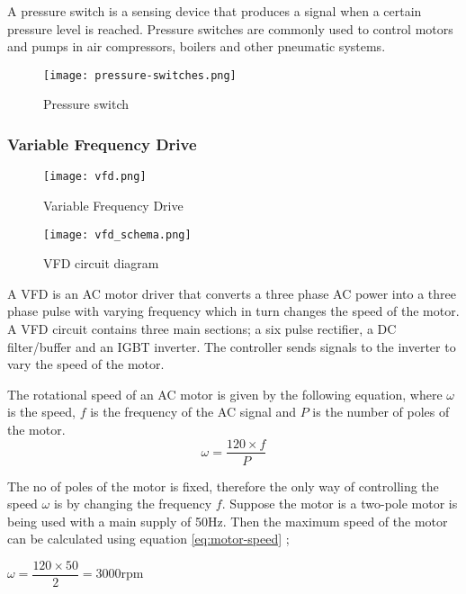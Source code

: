 \documentclass[a4paper,12pt]{article}
\begin{document}
				A pressure switch is a sensing device that produces a signal when a certain pressure level is reached.
				Pressure switches are commonly used to control motors and pumps in air compressors, boilers and other pneumatic systems. 
				
				
						\begin{figure}[H]
							\centering
							\texttt{[image: pressure-switches.png]}
							\caption{Pressure switch}
							\label{fig:pressure-switch}
						\end{figure}
						
				\subsubsection*{Variable Frequency Drive}
				
						\begin{figure}[H]
							\centering
							\texttt{[image: vfd.png]}
							\caption{Variable Frequency Drive}
							\label{fig:vfd}
						\end{figure}
						
						\begin{figure}[H]
							\centering
							\texttt{[image: vfd\_schema.png]}
							\caption{VFD circuit diagram}
							\label{fig:vfd-circuit}
						\end{figure}
						
						A VFD is an AC motor driver that converts a three phase AC power into a three phase pulse with varying frequency which in turn changes the speed of the motor.
						A VFD circuit contains three main sections; a six pulse rectifier, a DC filter/buffer and an IGBT inverter. The controller sends signals to the inverter to vary the speed of the motor.
						
						\newpage
						
						The rotational speed of an AC motor is given by the following equation, where $\omega$ is the speed, $f$ is the frequency of the AC signal and $P$ is the number of poles of the motor.
						\begin{equation}
							\omega = \dfrac{{120} \times {f}}{P}
							\label{eq:motor-speed}						
						\end{equation}
						
						The no of poles of the motor is fixed, therefore the only way of controlling the speed $\omega$ is by changing the frequency $f$.
						Suppose the motor is a two-pole motor is being used with a main supply of 50Hz.
						Then the maximum speed of the motor can be calculated using equation \ref{eq:motor-speed} \citep{vfd};
						\vspace{0.5cm}
						\begin{center}
							$\omega = \dfrac{120 \times 50}{2} = 3000$rpm 
						\end{center}
						
\end{document}

